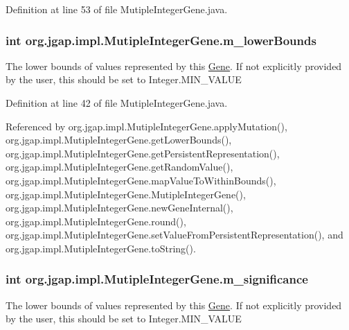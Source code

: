 Definition at line 53 of file Mutiple\-Integer\-Gene.\-java.

\hypertarget{classorg_1_1jgap_1_1impl_1_1_mutiple_integer_gene_a7b45efab7e7616c0500aa75a91b5bb5e}{
\subsubsection[{m\-\_\-lower\-Bounds}]{\setlength{\rightskip}{0pt plus 5cm}int org.\-jgap.\-impl.\-Mutiple\-Integer\-Gene.\-m\-\_\-lower\-Bounds\hspace{0.3cm}{\ttfamily [private]}}}\label{classorg_1_1jgap_1_1impl_1_1_mutiple_integer_gene_a7b45efab7e7616c0500aa75a91b5bb5e}
The lower bounds of values represented by this \hyperlink{interfaceorg_1_1jgap_1_1_gene}{Gene}. If not explicitly provided by the user, this should be set to Integer.\-M\-I\-N\-\_\-\-V\-A\-L\-U\-E 

Definition at line 42 of file Mutiple\-Integer\-Gene.\-java.



Referenced by org.\-jgap.\-impl.\-Mutiple\-Integer\-Gene.\-apply\-Mutation(), org.\-jgap.\-impl.\-Mutiple\-Integer\-Gene.\-get\-Lower\-Bounds(), org.\-jgap.\-impl.\-Mutiple\-Integer\-Gene.\-get\-Persistent\-Representation(), org.\-jgap.\-impl.\-Mutiple\-Integer\-Gene.\-get\-Random\-Value(), org.\-jgap.\-impl.\-Mutiple\-Integer\-Gene.\-map\-Value\-To\-Within\-Bounds(), org.\-jgap.\-impl.\-Mutiple\-Integer\-Gene.\-Mutiple\-Integer\-Gene(), org.\-jgap.\-impl.\-Mutiple\-Integer\-Gene.\-new\-Gene\-Internal(), org.\-jgap.\-impl.\-Mutiple\-Integer\-Gene.\-round(), org.\-jgap.\-impl.\-Mutiple\-Integer\-Gene.\-set\-Value\-From\-Persistent\-Representation(), and org.\-jgap.\-impl.\-Mutiple\-Integer\-Gene.\-to\-String().

\hypertarget{classorg_1_1jgap_1_1impl_1_1_mutiple_integer_gene_a1141637eb3370afa0aa721074a4c129b}{
\subsubsection[{m\-\_\-significance}]{\setlength{\rightskip}{0pt plus 5cm}int org.\-jgap.\-impl.\-Mutiple\-Integer\-Gene.\-m\-\_\-significance\hspace{0.3cm}{\ttfamily [private]}}}\label{classorg_1_1jgap_1_1impl_1_1_mutiple_integer_gene_a1141637eb3370afa0aa721074a4c129b}
The lower bounds of values represented by this \hyperlink{interfaceorg_1_1jgap_1_1_gene}{Gene}. If not explicitly provided by the user, this should be set to Integer.\-M\-I\-N\-\_\-\-V\-A\-L\-U\-E 

